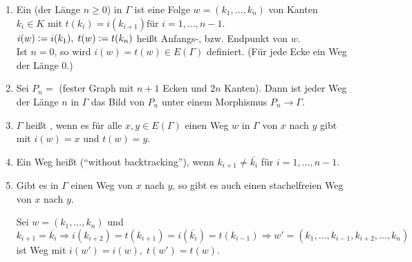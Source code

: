 \documentclass[a4paper, 10pt]{report}
\begin{document}
\begin{DefBem}
\begin{enumerate}
  \item Ein  (der Länge $n \ge 0$) in $\Gamma$ ist eine Folge $w = (k_1,
  \ldots, k_n)$ von Kanten $k_i \in K \textrm{ mit } t(k_i) = i(k_{i+1}) \mbox{
  für }i=1, \ldots, n-1$.\\
  $i(w) \mathrel{\mathop:}= i(k_1), \; t(w) \mathrel{\mathop:}= t(k_n)$ heißt Anfangs-, bzw. Endpunkt 
  von $w$.\\ Ist $n=0$, so wird $i(w) = t(w) \in E(\Gamma)$ definiert. (Für jede Ecke ein Weg der Länge 0.)
  \item Sei $P_n = $
  (fester Graph mit $n+1$ Ecken und $2n$ Kanten).
  Dann ist jeder Weg der Länge $n$ in $\Gamma$ das Bild von $P_n$ unter einem
  Morphismus $P_n \to \Gamma$.
  \item $\Gamma$ heißt , wenn es für alle $x,y \in E(\Gamma)$
  einen Weg $w$ in $\Gamma$ von $x$ nach $y$ gibt mit $i(w) = x \textrm{ und }t(w) = y$.
  \item Ein Weg heißt  (``without backtracking''), wenn $k_{i+1} \not=
  \overline{k_i}$ für $i=1,\ldots, n-1$.
  \item Gibt es in $\Gamma$ einen Weg von $x$ nach $y$, so gibt es auch einen
  stachelfreien Weg von $x$ nach $y$.
  \begin{Bew}
  Sei $w = (k_1, \ldots, k_n)$ und $k_{i+1} = \overline{k_i} \Rightarrow
  i(k_{i+2}) = t(k_{i+1}) = i(\overline{k_i}) = t(k_{i-1}) \Rightarrow w' =
  (k_1, \ldots, k_{i-1}, k_{i+2}, \ldots, k_n)$ ist Weg mit $i(w') = i(w), \;
  t(w') = t(w)$.
  \end{Bew}
\end{enumerate}  
\end{DefBem}
\end{document}

